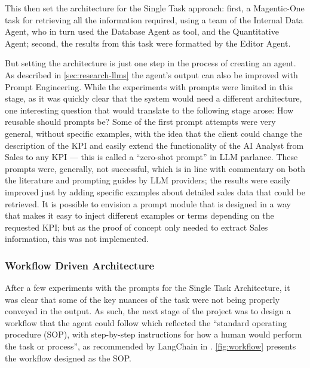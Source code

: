 \documentclass[a4paper]{report}
\begin{document}
This then set the architecture for the Single Task approach: first, a Magentic-One task for retrieving all the information required, using a team of the Internal Data Agent, who in turn used the Database Agent as tool, and the Quantitative Agent; second, the results from this task were formatted by the Editor Agent.

But setting the architecture is just one step in the process of creating an agent. As described in \autoref{sec:research-llms} the agent's output can also be improved with Prompt Engineering. While the experiments with prompts were limited in this stage, as it was quickly clear that the system would need a different architecture, one interesting question that would translate to the following stage arose: How reusable should prompts be? Some of the first prompt attempts were very general, without specific examples, with the idea that the client could change the description of the KPI and easily extend the functionality of the AI Analyst from Sales to any KPI --- this is called a ``zero-shot prompt'' in LLM parlance. These prompts were, generally, not successful, which is in line with commentary on both the literature and prompting guides by LLM providers; the results were easily improved just by adding specific examples about detailed sales data that could be retrieved. It is possible to envision a prompt module that is designed in a way that makes it easy to inject different examples or terms depending on the requested KPI; but as the proof of concept only needed to extract Sales information, this was not implemented.

\subsubsection{Workflow Driven Architecture}

After a few experiments with the prompts for the Single Task Architecture, it was clear that some of the key nuances of the task were not being properly conveyed in the output. As such, the next stage of the project was to design a workflow that the agent could follow which reflected the ``standard operating procedure (SOP), with step-by-step instructions for how a human would perform the task or process'', as recommended by LangChain in \cite{langchain2025buildAgent}. \autoref{fig:workflow} presents the workflow designed as the SOP.
\end{document}
